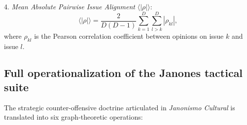 \documentclass[11pt,a4paper]{article}
\begin{document}
4. \emph{Mean Absolute Pairwise Issue Alignment} $\langle |\rho| \rangle$:
\begin{equation}
    \langle |\rho| \rangle = \frac{2}{D(D-1)} \sum_{k=1}^D \sum_{l > k}^D |\rho_{kl}|,
    \label{eq:mean_alignment}
\end{equation}
where $\rho_{kl}$ is the Pearson correlation coefficient between opinions on issue $k$ and issue $l$.

\subsection{Full operationalization of the Janones tactical suite}
\label{sssec:janones_tactical_suite}
The strategic counter-offensive doctrine articulated in \emph{Janonismo Cultural} is translated into six graph-theoretic operations:
\end{document}
